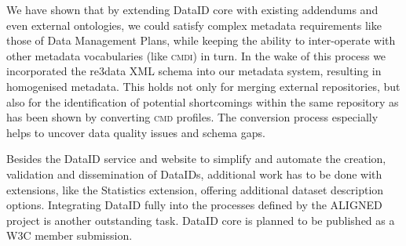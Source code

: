 \documentclass[runningheads,a4paper]{llncs}
\newcommand{\cmdi}{{\scshape cmdi}\xspace}
\newcommand{\cmd}{{\scshape cmd}\xspace}
\newcommand{\dmp}{{\scshape dmp}\xspace}
\begin{document}
We have shown that by extending DataID core with existing addendums and even external ontologies, we could satisfy complex metadata requirements like those of Data Management Plans, while keeping the ability to inter-operate with other metadata vocabularies (like \cmdi) in turn. In the wake of this process we incorporated the re3data XML schema into our metadata system, resulting in homogenised metadata. This holds not only for merging external repositories, but also for the identification of potential shortcomings within the same repository as has been shown by converting \cmd profiles. The conversion process especially helps to uncover data quality issues and schema gaps.


Besides the DataID service and website to simplify and automate the creation, validation and dissemination of DataIDs, additional work has to be done with extensions, like the Statistics extension, offering additional dataset description options. Integrating DataID fully into the processes defined by the ALIGNED project is another outstanding task.
DataID core is planned to be published as a W3C member submission.
\end{document}

